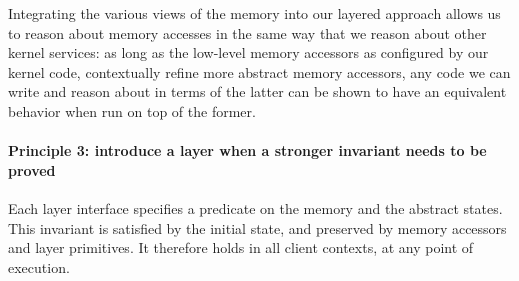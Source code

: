 Integrating the various views of the memory into our layered approach
allows us to reason about memory accesses in the same way that
we reason about other kernel services:
as long as the low-level memory accessors
as configured by our kernel code,
contextually refine more abstract memory accessors,
any code we can write and reason about in terms of the latter
can be shown to have an equivalent behavior
when run on top of the former.





\paragraph{Principle 3: introduce a layer when a stronger invariant needs to be proved}
Each  layer interface specifies a predicate
on the memory and the abstract states.
This invariant is satisfied by the initial state, and
preserved by memory accessors and layer primitives.
It therefore holds in all client contexts,
at any point of execution.

